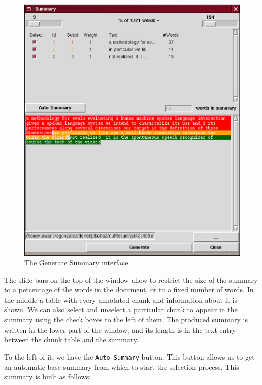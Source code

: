 \documentclass{article}
\begin{document}
\begin{figure}[pt]
\begin{center}
\includegraphics[width=145mm]{img/sumplugin.eps}

\caption{The Generate Summary interface}
\label{fig:sumpluginscreen}
\end{center}
\end{figure}

The slide bars on the top of the window allow to restrict the size of
the summary to a percentage of the words in the document, or to a
fixed number of words. In the middle a table with every annotated
chunk and information about it is shown. We can also select and
unselect a particular chunk to appear in the summary using the
check boxes to the left of them. The produced summary is written in the
lower part of the window, and its length is in the text entry between
the chunk table and the summary.

To the left of it, we have the \texttt{Auto-Summary} button. This
button allows us to get an automatic base summary from which to start
the selection process. This summary is built as follows:
\end{document}
